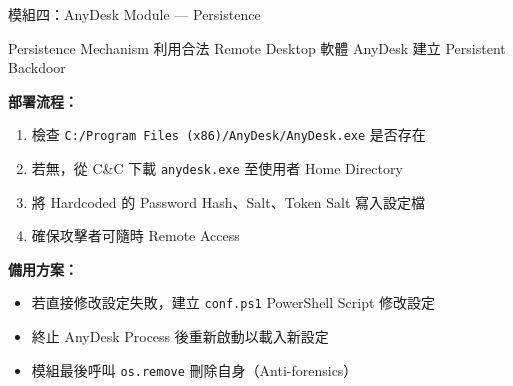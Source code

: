 \documentclass{beamer}
\begin{document}
\begin{frame}{模組四：AnyDesk Module — Persistence}
  \begin{alertblock}{Persistence Mechanism}
    利用合法 Remote Desktop 軟體 AnyDesk 建立 Persistent Backdoor
  \end{alertblock}

  \textbf{部署流程：}
  \begin{enumerate}
    \item 檢查 \texttt{C:/Program Files (x86)/AnyDesk/AnyDesk.exe} 是否存在
    \item 若無，從 C\&C 下載 \texttt{anydesk.exe} 至使用者 Home Directory
    \item 將 Hardcoded 的 Password Hash、Salt、Token Salt 寫入設定檔
    \item 確保攻擊者可隨時 Remote Access
  \end{enumerate}

  \vspace{0.3cm}
  \textbf{備用方案：}
  \begin{itemize}
    \item 若直接修改設定失敗，建立 \texttt{conf.ps1} PowerShell Script 修改設定
    \item 終止 AnyDesk Process 後重新啟動以載入新設定
    \item 模組最後呼叫 \texttt{os.remove} 刪除自身（Anti-forensics）
  \end{itemize}
\end{frame}
\end{document}

